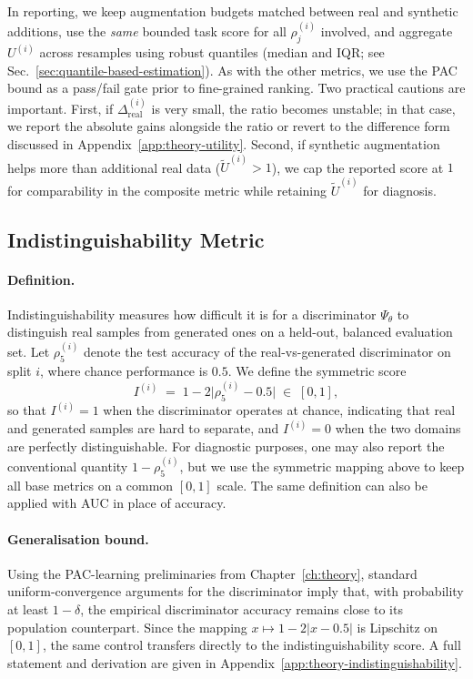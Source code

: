 In reporting, we keep augmentation budgets matched between real and synthetic
additions, use the \emph{same} bounded task score for all $\rho_j^{(i)}$
involved, and aggregate $U^{(i)}$ across resamples using robust quantiles
(median and IQR; see Sec.~\ref{sec:quantile-based-estimation}). As with the
other metrics, we use the PAC bound as a pass/fail gate prior to fine-grained
ranking. Two practical cautions are important. First, if
$\Delta_{\mathrm{real}}^{(i)}$ is very small, the ratio becomes unstable; in
that case, we report the absolute gains alongside the ratio or revert to the
difference form discussed in Appendix~\ref{app:theory-utility}. Second, if
synthetic augmentation helps more than additional real data
($\tilde U^{(i)}>1$), we cap the reported score at $1$ for comparability in the
composite metric while retaining $\tilde U^{(i)}$ for diagnosis.
\subsection{Indistinguishability Metric}
\label{sec:indistinguishability}

\paragraph{Definition.}
Indistinguishability measures how difficult it is for a discriminator
$\Psi_\theta$ to distinguish real samples from generated ones on a held-out,
balanced evaluation set. Let $\rho^{(i)}_5$ denote the test accuracy of the
real-vs-generated discriminator on split $i$, where chance performance is
$0.5$. We define the symmetric score
\[
I^{(i)} \;=\; 1 - 2\bigl|\rho^{(i)}_5 - 0.5\bigr| \;\in\; [0,1],
\]
so that $I^{(i)}=1$ when the discriminator operates at chance, indicating that
real and generated samples are hard to separate, and $I^{(i)}=0$ when the two
domains are perfectly distinguishable. For diagnostic purposes, one may also
report the conventional quantity $1-\rho^{(i)}_5$, but we use the symmetric
mapping above to keep all base metrics on a common $[0,1]$ scale. The same
definition can also be applied with AUC in place of accuracy.

\paragraph{Generalisation bound.}
Using the PAC-learning preliminaries from Chapter~\ref{ch:theory}, standard
uniform-convergence arguments for the discriminator imply that, with
probability at least $1-\delta$, the empirical discriminator accuracy remains
close to its population counterpart. Since the mapping
$x \mapsto 1-2|x-0.5|$ is Lipschitz on $[0,1]$, the same control transfers
directly to the indistinguishability score. A full statement and derivation are
given in Appendix~\ref{app:theory-indistinguishability}.

